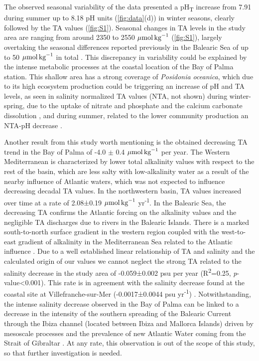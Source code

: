The observed seasonal variability of the data presented a pH\textsubscript{T}
increase from 7.91 during summer up to 8.18 pH units (\cref{fig:data}(d)) in
winter seasons, clearly followed by the TA values (\cref{fig:S1}). Seasonal
changes in TA levels in the study area are ranging from around 2350 to 2550
${\mu \textrm{mol\,kg}^{-1}}$ (\cref{fig:S1}), largely overtaking the seasonal
differences reported previously in the Balearic Sea of up to 50 ${\mu
            \textrm{mol\,kg}^{-1}}$ in total
\cite{cossarini2015spatiotemporal}. This discrepancy in variability could
be explained by the intense metabolic processes at the coastal location of the
Bay of Palma station. This shallow area has a strong coverage of
\emph{Posidonia oceanica}, which due to its high ecosystem
production \cite{koopmans2020high} could be triggering an increase of pH and TA
levels, as seen in salinity normalized TA values (NTA, not shown) during
winter-spring, due to the uptake of nitrate and phosphate and the calcium
carbonate dissolution \cite{barron2006organic,cossarini2015spatiotemporal}, and
during summer, related to the lower community
production \cite{champenois2012seasonal} an NTA-pH
decrease \cite{cossarini2015spatiotemporal}.

Another result from this study worth mentioning is the obtained
decreasing TA trend in the Bay of Palma of -4.0 $\pm$ 0.4 ${\mu
            \textrm{mol\,kg}^{-1}}$ per year. The Western Mediterranean is
characterized by lower total alkalinity values with respect to the rest of the
basin, which are less salty with low-alkalinity water
\cite{RIVARO2010236,hassoun2015modeling} as a result of the nearby influence of
Atlantic waters, which was not expected to influence decreasing decadal TA
values. In the northwestern basin, TA values increased over time at a rate of
2.08±0.19 ${\mu\textrm{mol\,kg}^{-1}}$ yr\textsuperscript{-1}. In the Balearic
Sea, the decreasing TA confirms the Atlantic forcing on the alkalinity values
and the negligible TA discharges due to rivers in the Balearic Islands. There
is a marked south-to-north surface gradient in the western region coupled with
the west-to-east gradient of alkalinity in the Mediterranean Sea related to the
Atlantic influence \cite{cossarini2015spatiotemporal,Gemayel2015}. Due to a
well established linear relationship of TA and
salinity \cite{schneider2007alkalinity} and the calculated origin of our
values \cite{Gemayel2015} we cannot neglect the strong TA related to the
salinity decrease in the study area of -0.059±0.002 psu per year
(R\textsuperscript{2}=0.25, \emph{p}-value<0.001). This rate is in agreement
with the salinity decrease found at the coastal site at Villefranche-sur-Mer
(-0.0017±0.0044 psu yr\textsuperscript{-1}) \cite{Kapsenberg2017}.
Notwithstanding, the intense salinity decrease observed in the Bay of Palma can
be linked to a decrease in the intensity of the southern spreading of the
Balearic Current through the Ibiza channel (located between Ibiza and Mallorca
Islands) driven by mesoscale processes and the prevalence of new Atlantic
Water coming from the Strait of Gibraltar \cite{millot1999circulation}.
At any rate, this observation is out of the scope of this study, so that
further investigation is needed.

